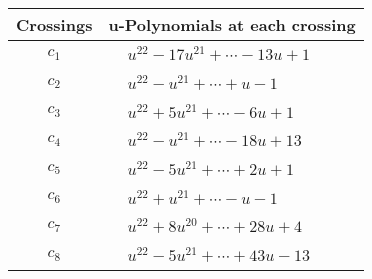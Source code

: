 \documentclass[1p]{elsarticle_modified}
\theoremstyle{definition}
\begin{document}
\begin{tabular}{m{50pt}|m{274pt}}
Crossings & \hspace{64pt}u-Polynomials at each crossing \\
\hline $$\begin{aligned}c_{1}\end{aligned}$$&$\begin{aligned}
&u^{22}-17 u^{21}+\cdots-13 u+1
\end{aligned}$\\
\hline $$\begin{aligned}c_{2}\end{aligned}$$&$\begin{aligned}
&u^{22}- u^{21}+\cdots+u-1
\end{aligned}$\\
\hline $$\begin{aligned}c_{3}\end{aligned}$$&$\begin{aligned}
&u^{22}+5 u^{21}+\cdots-6 u+1
\end{aligned}$\\
\hline $$\begin{aligned}c_{4}\end{aligned}$$&$\begin{aligned}
&u^{22}- u^{21}+\cdots-18 u+13
\end{aligned}$\\
\hline $$\begin{aligned}c_{5}\end{aligned}$$&$\begin{aligned}
&u^{22}-5 u^{21}+\cdots+2 u+1
\end{aligned}$\\
\hline $$\begin{aligned}c_{6}\end{aligned}$$&$\begin{aligned}
&u^{22}+u^{21}+\cdots- u-1
\end{aligned}$\\
\hline $$\begin{aligned}c_{7}\end{aligned}$$&$\begin{aligned}
&u^{22}+8 u^{20}+\cdots+28 u+4
\end{aligned}$\\
\hline $$\begin{aligned}c_{8}\end{aligned}$$&$\begin{aligned}
&u^{22}-5 u^{21}+\cdots+43 u-13
\end{aligned}$\\

\end{tabular}
\end{document}
